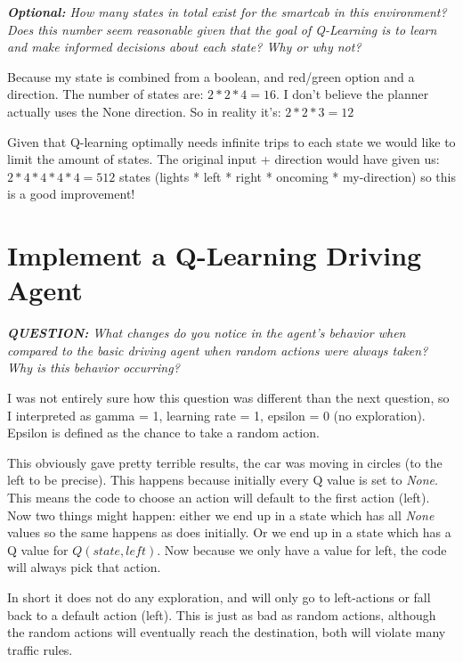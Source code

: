 \documentclass[11pt]{article}
\begin{document}
\begin{center}
\textit{\textbf{Optional:} How many states in total exist for the smartcab in this environment? Does this number seem reasonable given that the goal of Q-Learning is to learn and make informed decisions about each state? Why or why not?}
\end{center} 
Because my state is combined from a boolean, and red/green option and a direction. The number of states are: $2 * 2 * 4 = 16$. I don't believe the planner actually uses the None direction. So in reality it's: $ 2 * 2 * 3 = 12$

Given that Q-learning optimally needs infinite trips to each state we would like to limit the amount of states. The original input + direction would have given us: $ 2 * 4 * 4 * 4 * 4 = 512 $ states (lights * left * right * oncoming * my-direction) so this is a good improvement!
\section{Implement a Q-Learning Driving Agent}
\begin{center}
\textit{\textbf{QUESTION:} What changes do you notice in the agent's behavior when compared to the basic driving agent when random actions were always taken? Why is this behavior occurring?}
\end{center}
I was not entirely sure how this question was different than the next question, so I interpreted as gamma = 1, learning rate = 1, epsilon = 0 (no exploration). Epsilon is defined as the chance to take a random action.\par
This obviously gave pretty terrible results, the car was moving in circles (to the left to be precise). This happens because initially every Q value is set to \textit{None}. This means the code to choose an action will default to the first action (left). Now two things might happen: either we end up in a state which has all \textit{None} values so the same happens as does initially. Or we end up in a state which has a Q value for $Q(state, left)$. Now because we only have a value for left, the code will always pick that action.\par
In short it does not do any exploration, and will only go to left-actions or fall back to a default action (left). This is just as bad as random actions, although the random actions will eventually reach the destination, both will violate many traffic rules.
\end{document}
